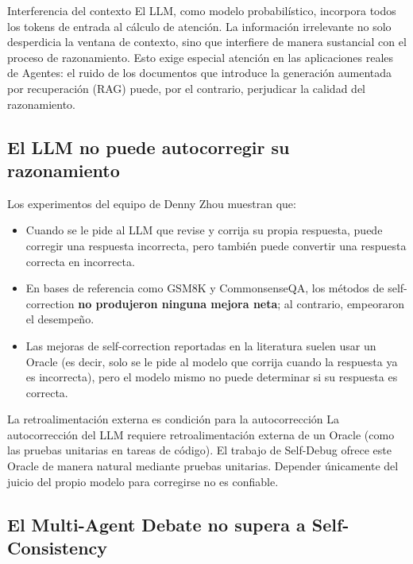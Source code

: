 \documentclass[a4paper]{article}
\begin{document}
\begin{warningbox}{Interferencia del contexto}
El LLM, como modelo probabilístico, incorpora todos los tokens de entrada al cálculo de atención. La información irrelevante no solo desperdicia la ventana de contexto, sino que interfiere de manera sustancial con el proceso de razonamiento. Esto exige especial atención en las aplicaciones reales de Agentes: el ruido de los documentos que introduce la generación aumentada por recuperación (RAG) puede, por el contrario, perjudicar la calidad del razonamiento.
\end{warningbox}

\subsection{El LLM no puede autocorregir su razonamiento}

Los experimentos del equipo de Denny Zhou muestran que:

\begin{itemize}
    \item Cuando se le pide al LLM que revise y corrija su propia respuesta, puede corregir una respuesta incorrecta, pero también puede convertir una respuesta correcta en incorrecta.
    \item En bases de referencia como GSM8K y CommonsenseQA, los métodos de self-correction \textbf{no produjeron ninguna mejora neta}; al contrario, empeoraron el desempeño.
    \item Las mejoras de self-correction reportadas en la literatura suelen usar un Oracle (es decir, solo se le pide al modelo que corrija cuando la respuesta ya es incorrecta), pero el modelo mismo no puede determinar si su respuesta es correcta.
\end{itemize}

\begin{importantbox}{La retroalimentación externa es condición para la autocorrección}
La autocorrección del LLM requiere retroalimentación externa de un Oracle (como las pruebas unitarias en tareas de código). El trabajo de Self-Debug ofrece este Oracle de manera natural mediante pruebas unitarias. Depender únicamente del juicio del propio modelo para corregirse no es confiable.
\end{importantbox}

\subsection{El Multi-Agent Debate no supera a Self-Consistency}
\end{document}
